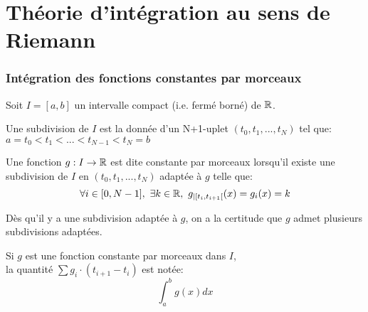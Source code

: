 \documentclass[../main.tex]{subfile}
\begin{document}
\part{Théorie d'intégration au sens de Riemann}

\section{Intégration des fonctions constantes par morceaux}
Soit $I = [a, b]$ un intervalle compact (i.e. fermé borné) de $\mathbb{R}$.\\

\begin{defi}
	Une subdivision de $I$ est la donnée d'un N+1-uplet $(t_0, t_1, ..., t_N)$ tel que:\\
	$a = t_0 < t_1 < ... < t_{N-1} < t_N = b$
\end{defi}

\begin{defi}
	Une fonction $g:I \to \mathbb{R}$ est dite constante par morceaux lorsqu'il existe une subdivision de $I$ en $(t_0, t_1, ..., t_{N})$ adaptée à $g$ telle que:
	$$\forall i \in [0, N-1], \ \exists k \in \RR, \ g_{|[t_i, t_{i+1}[} (x) = g_i(x) = k$$
\end{defi}

\begin{rema}
	Dès qu'il y a une subdivision adaptée à $g$, on a la certitude que $g$ admet plusieurs subdivisions adaptées.
\end{rema}

\begin{defi}
	Si $g$ est une fonction constante par morceaux dans $I$,\\
	la quantité $\sum g_i \cdot (t_{i+1} - t_i)$ est notée:
	$$\int_a^bg(x)dx$$
\end{defi}
\end{document}

